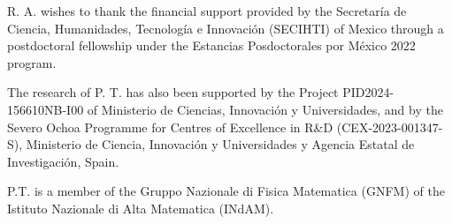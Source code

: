 \documentclass[10pt]{amsart}
\numberwithin{equation}{section}
\theoremstyle{definition}
\begin{document}
R. A. wishes to thank the financial support provided by the Secretaría de Ciencia, Humanidades, Tecnología e Innovación (SECIHTI) of Mexico through a postdoctoral fellowship under the Estancias Posdoctorales por México 2022 program. 


The research of P. T. has also been supported by the Project PID2024-156610NB-I00 of Ministerio de Ciencias, Innovaci\'on y Universidades,  and by  the Severo Ochoa Programme for Centres of Excellence in R\&D
(CEX-2023-001347-S), Ministerio de Ciencia, Innovaci\'{o}n y Universidades y Agencia Estatal de Investigaci\'on, Spain.

P.T. is a member of the Gruppo Nazionale di Fisica Matematica (GNFM) of the Istituto Nazionale di Alta Matematica (INdAM). 
\end{document}
